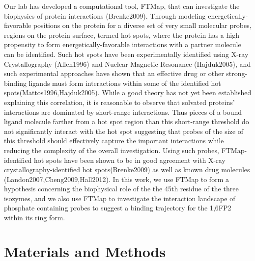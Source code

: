 \documentclass[11pt,a4paper]{article}
\begin{document}
	Our lab has developed a computational tool, FTMap, that can investigate the biophysics of protein interactions (Brenke2009).  Through modeling 
	energetically-favorable positions 
	on the protein for a diverse set of very small molecular probes, regions on the protein surface, termed hot spots, where the protein has a high
	propensity to form
	energetically-favorable interactions with a partner molecule can be identified.  Such hot spots have been experimentally identified using 
	X-ray Crystallography (Allen1996) and Nuclear 
	Magnetic Resonance (Hajduk2005), and such experimental approaches have shown that an effective drug or other strong-binding ligands must form interactions within
	some of the identified hot spots(Mattos1996,Hajduk2005).  While a good theory has not yet been established explaining this correlation, it is reasonable
	to observe that solvated proteins' interactions are dominated by short-range interactions.  Thus pieces of a bound ligand molecule farther from a hot
	spot region than this short-range threshold do not significantly interact with the hot spot suggesting that probes of the size of this 
	threshold should effectively capture the important interactions while reducing the complexity of the overall investigation.  Using such probes,
	FTMap-identified hot spots have been shown to be in good agreement with X-ray crystallography-identified hot spots(Brenke2009)
	as well as known drug molecules (Landon2007,Cheng2009,Hall2012).  In this work, we use FTMap to form a hypothesis concerning the biophysical
	role of the the 45th residue of the three isozymes, and we also use FTMap to investigate the interaction landscape of phosphate containing probes
	to suggest a binding trajectory for the 1,6FP2 within its ring form.

\section{Materials and Methods}
\end{document}
